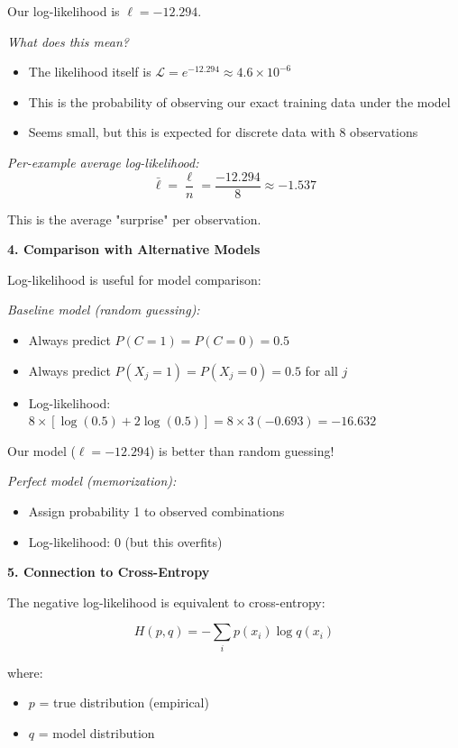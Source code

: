 \documentclass[12pt]{article}
\begin{document}
\begin{explanation}
Our log-likelihood is $\ell = -12.294$.

\textit{What does this mean?}

\begin{itemize}
    \item The likelihood itself is $\mathcal{L} = e^{-12.294} \approx 4.6 \times 10^{-6}$
    \item This is the probability of observing our exact training data under the model
    \item Seems small, but this is expected for discrete data with 8 observations
\end{itemize}

\textit{Per-example average log-likelihood:}
\[
\bar{\ell} = \frac{\ell}{n} = \frac{-12.294}{8} \approx -1.537
\]

This is the average "surprise" per observation.

\textbf{4. Comparison with Alternative Models}

Log-likelihood is useful for model comparison:

\textit{Baseline model (random guessing):}
\begin{itemize}
    \item Always predict $P(C=1) = P(C=0) = 0.5$
    \item Always predict $P(X_j=1) = P(X_j=0) = 0.5$ for all $j$
    \item Log-likelihood: $8 \times [\log(0.5) + 2\log(0.5)] = 8 \times 3(-0.693) = -16.632$
\end{itemize}

Our model ($\ell = -12.294$) is better than random guessing!

\textit{Perfect model (memorization):}
\begin{itemize}
    \item Assign probability 1 to observed combinations
    \item Log-likelihood: $0$ (but this overfits)
\end{itemize}

\textbf{5. Connection to Cross-Entropy}

The negative log-likelihood is equivalent to cross-entropy:

\[
H(p, q) = -\sum_i p(x_i) \log q(x_i)
\]

where:
\begin{itemize}
    \item $p$ = true distribution (empirical)
    \item $q$ = model distribution
\end{itemize}


\end{explanation}
\end{document}

